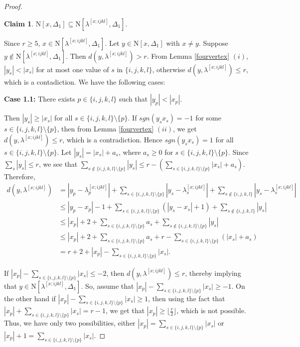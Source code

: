 \documentclass{amsart}
\theoremstyle{definition}
\newtheorem{claim}[theorem]{Claim}
\theoremstyle{remark}
\numberwithin{equation}{section}
\newcommand{\D}{\Delta}
\newcommand{\f}{\lfloor\frac{r}{2}\rfloor}
\def\n{{\mathrm{N}}}
\begin{document}
\begin{proof}
	\begin{claim}\label{claim:fourvertex}
		$\n[x, \D_1] \subseteq \n[\lambda^{[x;ijkl]}, \D_1]$.
	\end{claim}
	Since $r \geq 5$, $x\in\n[\lambda^{[x;ijkl]}, \D_1]$. Let $y\in\n[x,\D_1]$ with $x\neq y$. Suppose $y\notin \n[\lambda^{[x;ijkl]},\D_1]$.
	Then $d(y,\lambda^{[x;ijkl]})>r$. From Lemma \ref{fourvertex} $(i)$, $|y_s|<|x_s|$ for at most one value of $s$ in $\{i,j,k,l\}$, otherwise $d(y,\lambda^{[x;ijkl]})\leq r$, which is a contadiction. We have the following cases:
	
	\smallskip 
	
	\noindent\textbf{Case 1.1:} There exists $p \in \{i, j, k, l\}$ such that $|y_p| < |x_p|$. 
	
	
	Then  $|y_s|\geq |x_s|$  for all $s\in \{ i, j,k,l\} \setminus \{p\}$. If  $sgn(y_sx_s)=-1$ for some $s \in \{i, j, k, l\} \setminus \{p\}$, then from Lemma \ref{fourvertex} $(ii)$, we get $d(y,\lambda^{[x;ijkl]})\leq r$,  which is a contradiction. Hence $sgn(y_sx_s)=1$ for all $s \in \{i, j, k, l\} \setminus \{p\}$. Let $|y_s|=|x_s|+a_s$, where $a_s\geq 0$ for $s \in \{i, j, k, l\} \setminus \{p\}$.  Since $\sum_{s}|y_s|\leq r$, we see that $\sum_{s\notin \{i, j,k,l\} \setminus \{p\}}|y_s|\leq r-(\sum_{s \in \{i, j, k, l \} \setminus \{p\}}|x_s|+a_s)$. Therefore,
	\begin{align*}
		d(y,\lambda^{[x;ijkl]})&=|y_p-\lambda^{[x;ijkl]}_p|+ \sum_{s \in \{i, j, k, l\}\setminus\{p\}}|y_s-\lambda^{[x;ijkl]}_s|+\sum_{s\notin\{i,j,k,l\}}|y_s-\lambda^{[x;ijkl]}_s| \\
		&\leq  |y_p-x_p|-1+ \sum_{s \in \{i, j, k, l\}\setminus\{p\}}(|y_s-x_s|+1 )+\sum_{s\notin\{i,j,k,l\}}|y_s| \\
		&\leq|x_p|+2+\sum_{s \in \{i, j, k, l\}\setminus \{p\}} a_s+\sum_{s\notin\{i, j,k,l\} \setminus \{p\}}|y_s| \\
		&\leq |x_p|+2 + \sum_{s \in \{i, j, k, l\}\setminus \{p\}} a_s+r- \sum_{s \in \{i, j, k, l\}\setminus \{p\}} (|x_s|+a_s) \\
		&= r+2+|x_p|-\sum_{s \in \{i, j, k, l\}\setminus \{p\}} |x_s|.
	\end{align*}
	
	
	If $|x_p|-\sum_{s \in \{i, j, k, l\}\setminus \{p\}} |x_s|\leq -2$, then $d(y,\lambda^{[x;ijkl]})\leq r$, thereby implying that $y \in \n[\lambda^{[x;ijkl]}, \D_1]$. So, assume that $|x_p|-\sum_{s \in \{i, j, k, l\}\setminus \{p\}} |x_s|\geq -1$. On the other hand if $|x_p|-\sum_{s \in \{i, j, k, l\}\setminus \{p\}} |x_s|\geq 1$, then using the fact that $|x_p|+\sum_{s \in \{i, j, k, l\}\setminus \{p\}} |x_s| =r-1$, we get that $|x_p|\geq \f$, which is not possible. Thus, we have only two possibilities, either $|x_p|=\sum_{s \in \{i, j, k, l\}\setminus \{p\}} |x_s|$ or $|x_p|+1=\sum_{s \in \{i, j, k, l\}\setminus \{p\}} |x_s|$.
	

\end{proof}
\end{document}

